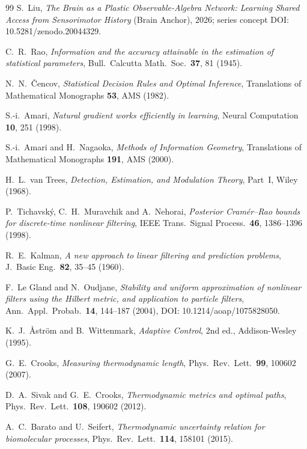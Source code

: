 \documentclass[12pt]{article}
\theoremstyle{definition}
\begin{document}
\begin{thebibliography}{99}
S.~Liu, \emph{The Brain as a Plastic Observable-Algebra Network:
Learning Shared Access from Sensorimotor History} (Brain Anchor),
2026; series concept DOI: 10.5281/zenodo.20044329.

C.~R.~Rao,
\emph{Information and the accuracy attainable in the estimation of statistical parameters},
Bull.\ Calcutta Math.\ Soc.\ \textbf{37}, 81 (1945).

N.~N.~\v{C}encov,
\emph{Statistical Decision Rules and Optimal Inference},
Translations of Mathematical Monographs \textbf{53}, AMS (1982).

S.-i.~Amari,
\emph{Natural gradient works efficiently in learning},
Neural Computation \textbf{10}, 251 (1998).

S.-i.~Amari and H.~Nagaoka,
\emph{Methods of Information Geometry},
Translations of Mathematical Monographs \textbf{191}, AMS (2000).

H.~L.~van Trees,
\emph{Detection, Estimation, and Modulation Theory}, Part~I, Wiley (1968).

P.~Tichavsk\'y, C.~H.~Muravchik and A.~Nehorai,
\emph{Posterior Cram\'er--Rao bounds for discrete-time nonlinear filtering},
IEEE Trans.\ Signal Process.\ \textbf{46}, 1386--1396 (1998).

R.~E.~Kalman,
\emph{A new approach to linear filtering and prediction problems},
J.\ Basic Eng.\ \textbf{82}, 35--45 (1960).

F.~Le Gland and N.~Oudjane,
\emph{Stability and uniform approximation of nonlinear filters using the Hilbert metric, and application to particle filters},
Ann.\ Appl.\ Probab.\ \textbf{14}, 144--187 (2004), DOI: 10.1214/aoap/1075828050.

K.~J.~\AA{}str\"{o}m and B.~Wittenmark,
\emph{Adaptive Control}, 2nd ed., Addison-Wesley (1995).

G.~E.~Crooks,
\emph{Measuring thermodynamic length},
Phys.\ Rev.\ Lett.\ \textbf{99}, 100602 (2007).

D.~A.~Sivak and G.~E.~Crooks,
\emph{Thermodynamic metrics and optimal paths},
Phys.\ Rev.\ Lett.\ \textbf{108}, 190602 (2012).

A.~C.~Barato and U.~Seifert,
\emph{Thermodynamic uncertainty relation for biomolecular processes},
Phys.\ Rev.\ Lett.\ \textbf{114}, 158101 (2015).


\end{thebibliography}
\end{document}
